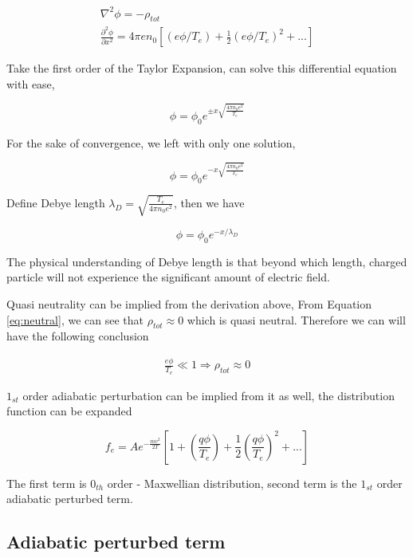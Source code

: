 \begin{eqnarray}
 \nabla^2 \phi = -\rho_{tot}\\
 \frac{\partial^2 \phi}{\partial x^2}=4\pi en_0[(e\phi/T_e)+\frac{1}{2}(e\phi/T_e)^2+...]
\end{eqnarray}

Take the first order of the Taylor Expansion, can solve this differential equation with ease,

\begin{equation}
    \phi=\phi_0e^{\pm x\sqrt{\frac{4\pi n_0e^2}{T_e}}}
\end{equation}

For the sake of convergence, we left with only one solution, 

\begin{equation}
    \phi=\phi_0e^{- x\sqrt{\frac{4\pi n_0e^2}{T_e}}}
\end{equation}

Define Debye length $\lambda_D=\sqrt{\frac{T_e}{4\pi n_0e^2}}$, then we have

\begin{equation}
     \phi=\phi_0e^{-x/\lambda_D}
\end{equation}

The physical understanding of Debye length is that beyond which length, charged particle will not experience the significant amount of electric field. 

Quasi neutrality can be implied from the derivation above, From Equation \ref{eq:neutral}, we can see that $\rho_{tot} \approx 0$ which is quasi neutral. Therefore we can will have the following conclusion 

\begin{eqnarray}
 \frac{e\phi}{T_e}\ll 1 \Longrightarrow \rho_{tot} \approx 0
\end{eqnarray}

$1_{st}$ order adiabatic perturbation can be implied from it as well, the distribution function can be expanded

\begin{equation}
    f_e=Ae^{-\frac{mv^2}{2T}}[1+(\frac{q\phi}{T_e})+\frac{1}{2}(\frac{q\phi}{T_e})^2+...]
\end{equation}

The first term is $0_{th}$ order - Maxwellian distribution, second term is the $1_{st}$ order adiabatic perturbed term.

\subsection{Adiabatic perturbed term}

